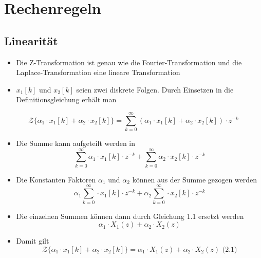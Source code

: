 \documentclass[11pt]{article}
\providecommand{\tightlist}{%
      \setlength{\itemsep}{0pt}\setlength{\parskip}{0pt}}
\begin{document}
    \section{Rechenregeln}\label{rechenregeln}

\subsection{Linearität}\label{linearituxe4t}

\begin{itemize}
\item
  Die Z-Transformation ist genau wie die Fourier-Transformation und die
  Laplace-Transformation eine lineare Transformation
\item
  \(x_1[k]\) und \(x_2[k]\) seien zwei diskrete Folgen. Durch Einsetzen
  in die Definitionsgleichung erhält man
\end{itemize}

\[\mathcal{Z}\{\alpha_1 \cdot x_1[k] + \alpha_2 \cdot x_2[k]\} =  \sum_{k=0}^\infty (\alpha_1 \cdot x_1[k] + \alpha_2 \cdot x_2[k]) \cdot z^{-k}\]

    \begin{itemize}
\tightlist
\item
  Die Summe kann aufgeteilt werden in
  \[\sum_{k=0}^\infty \alpha_1 \cdot x_1[k] \cdot z^{-k} + \sum_{k=0}^\infty \alpha_2 \cdot x_2[k] \cdot z^{-k}\]
\end{itemize}

    \begin{itemize}
\tightlist
\item
  Die Konstanten Faktoren \(\alpha_1\) und \(\alpha_2\) können aus der
  Summe gezogen werden
  \[\alpha_1 \sum_{k=0}^\infty \cdot x_1[k] \cdot z^{-k} + \alpha_2 \sum_{k=0}^\infty \cdot x_2[k] \cdot z^{-k}\]
\end{itemize}

    \begin{itemize}
\tightlist
\item
  Die einzelnen Summen können dann durch Gleichung 1.1 ersetzt werden
  \[\alpha_1 \cdot X_1(z) + \alpha_2 \cdot X_2(z)\]
\end{itemize}

    \begin{itemize}
\tightlist
\item
  Damit gilt
  \[\mathcal{Z}\{\alpha_1 \cdot x_1[k] + \alpha_2 \cdot x_2[k]\} = \alpha_1 \cdot X_1(z) + \alpha_2 \cdot X_2(z)\textrm{  (2.1)}\]
\end{itemize}
\end{document}
